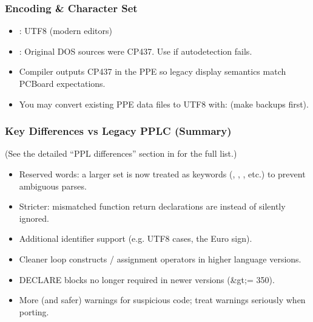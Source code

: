 \documentclass[letterpaper,10pt,english]{sphinxmanual}
\begin{document}
\subsubsection{Encoding \& Character Set}
\label{\detokenize{ppl:encoding-character-set}}\begin{itemize}
\item {} 
\sphinxAtStartPar
{}: UTF\sphinxhyphen{}8 (modern editors)

\item {} 
\sphinxAtStartPar
{}: Original DOS sources were CP437. Use  if auto\sphinxhyphen{}detection fails.

\item {} 
\sphinxAtStartPar
Compiler outputs CP437 in the PPE so legacy display semantics match PCBoard expectations.

\item {} 
\sphinxAtStartPar
You may convert existing PPE data files to UTF\sphinxhyphen{}8 with:  (make backups first).

\end{itemize}


\subsubsection{Key Differences vs Legacy PPLC (Summary)}
\label{\detokenize{ppl:key-differences-vs-legacy-pplc-summary}}
\sphinxAtStartPar
(See the detailed “PPL differences” section in  for the full list.)
\begin{itemize}
\item {} 
\sphinxAtStartPar
Reserved words: a larger set is now treated as keywords (, , , etc.) to prevent ambiguous parses.

\item {} 
\sphinxAtStartPar
Stricter: mismatched function return declarations are  instead of silently ignored.

\item {} 
\sphinxAtStartPar
Additional identifier support (e.g. UTF\sphinxhyphen{}8 cases, the Euro sign).

\item {} 
\sphinxAtStartPar
Cleaner loop constructs / assignment operators in higher language versions.

\item {} 
\sphinxAtStartPar
DECLARE blocks no longer required in newer versions (\&gt;= 350).

\item {} 
\sphinxAtStartPar
More (and safer) warnings for suspicious code; treat warnings seriously when porting.

\end{itemize}
\end{document}

